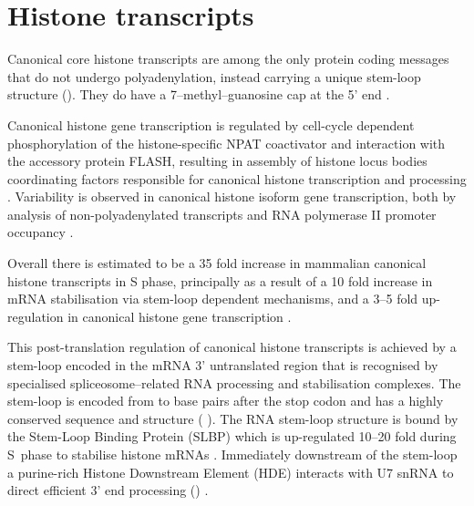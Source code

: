 \section{Histone transcripts}


  Canonical core histone transcripts are among the only protein coding messages
  that do not undergo polyadenylation, 
  instead carrying a unique stem-loop structure ().
  They do have a 7--methyl--guanosine cap at the 5' end \citep{MarzluffNatRevGen2008}.

  Canonical histone gene transcription is regulated
  by cell-cycle dependent phosphorylation of the histone-specific NPAT coactivator
  and interaction with the accessory protein FLASH,
  resulting in assembly of histone locus bodies
  coordinating factors responsible for canonical histone transcription and processing
  \citep{MarzluffNatRevGen2008,RattrayMueller2012,Hoefig2014}.
  Variability is observed in canonical histone isoform gene transcription,
  both by analysis of non-polyadenylated transcripts \citep{YangGenomeBiol2011}
  and RNA polymerase II promoter occupancy \citep{Ederveen2011}.

  Overall there is estimated to be a 35 fold increase in mammalian
  canonical histone transcripts in S phase,
  principally as a result of a 10 fold increase in mRNA stabilisation
  via stem-loop dependent mechanisms,
  and a 3--5 fold up-regulation in canonical histone gene transcription \citep{HarrisMCB1991}.

  This post-translation regulation of canonical histone transcripts
  is achieved by a stem-loop encoded in the mRNA 3' untranslated region
  that is recognised by specialised spliceosome--related RNA
  processing and stabilisation complexes.
  The stem-loop is encoded from \StemLoopStart{} to \StemLoopEnd{} base pairs after the stop codon
  and has a highly conserved sequence and structure
  ( \citep{stem-loop-structure}).
  The RNA stem-loop structure is bound by the Stem-Loop Binding Protein (SLBP)
  which is up-regulated 10--20 fold during S~phase to stabilise
  histone mRNAs \citep{SLBP-regulation}.
  Immediately downstream of the stem-loop a purine-rich Histone Downstream Element (HDE)
  interacts with U7 snRNA to direct efficient 3' end
  processing () \citep{HDE-sequence}.

